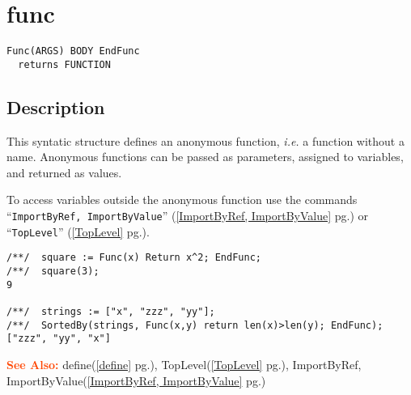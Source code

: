 \documentclass[a4paper]{mybook}
\newenvironment{command}{}{} %
\newcommand\SeeAlso{\par\textcolor{OrangeRed}{\textbf{\large See Also: }}}
\begin{document}
\section{func}
\label{func}
\begin{command} %


\begin{Verbatim}[label=syntax, rulecolor=\color{MidnightBlue},
frame=single]
Func(ARGS) BODY EndFunc
  returns FUNCTION
\end{Verbatim}


\subsection*{Description}

This syntatic structure defines an anonymous function, \textit{i.e.} a function
without a name.  Anonymous functions can be passed as parameters,
assigned to variables, and returned as values.
\par 
To access variables outside the anonymous function use the commands
``\verb&ImportByRef, ImportByValue&'' (\ref{ImportByRef, ImportByValue} pg.\pageref{ImportByRef, ImportByValue}) or ``\verb&TopLevel&'' (\ref{TopLevel} pg.\pageref{TopLevel}).
\begin{Verbatim}[label=example, rulecolor=\color{PineGreen}, frame=single]
/**/  square := Func(x) Return x^2; EndFunc;
/**/  square(3);
9

/**/  strings := ["x", "zzz", "yy"];
/**/  SortedBy(strings, Func(x,y) return len(x)>len(y); EndFunc);
["zzz", "yy", "x"]
\end{Verbatim}


\SeeAlso %
  define(\ref{define} pg.\pageref{define}), 
    TopLevel(\ref{TopLevel} pg.\pageref{TopLevel}), 
    ImportByRef, ImportByValue(\ref{ImportByRef, ImportByValue} pg.\pageref{ImportByRef, ImportByValue})
\end{command} %
\end{document}
